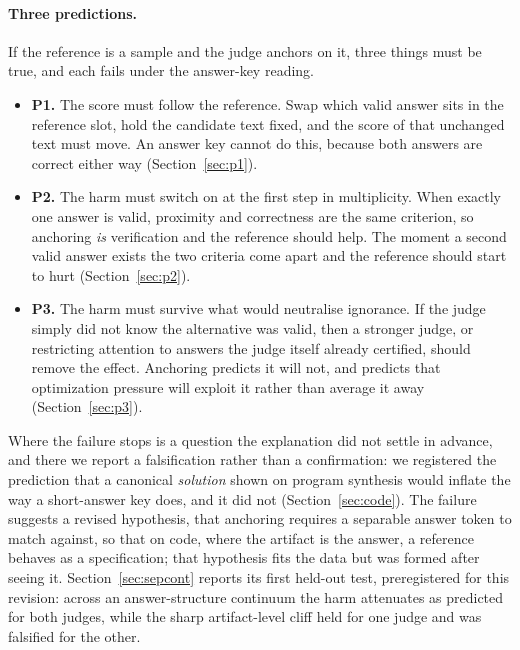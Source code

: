\documentclass[11pt]{article}
\begin{document}
\paragraph{Three predictions.}
If the reference is a sample and the judge anchors on it, three things must be true, and each fails under the answer-key reading.

\begin{itemize}
\item \textbf{P1.} The score must follow the reference. Swap which valid answer sits in the reference slot, hold the candidate text fixed, and the score of that unchanged text must move. An answer key cannot do this, because both answers are correct either way (Section~\ref{sec:p1}).
\item \textbf{P2.} The harm must switch on at the first step in multiplicity. When exactly one answer is valid, proximity and correctness are the same criterion, so anchoring \emph{is} verification and the reference should help. The moment a second valid answer exists the two criteria come apart and the reference should start to hurt (Section~\ref{sec:p2}).
\item \textbf{P3.} The harm must survive what would neutralise ignorance. If the judge simply did not know the alternative was valid, then a stronger judge, or restricting attention to answers the judge itself already certified, should remove the effect. Anchoring predicts it will not, and predicts that optimization pressure will exploit it rather than average it away (Section~\ref{sec:p3}).
\end{itemize}

Where the failure stops is a question the explanation did not settle in advance, and there we report a falsification rather than a confirmation: we registered the prediction that a canonical \emph{solution} shown on program synthesis would inflate the way a short-answer key does, and it did not (Section~\ref{sec:code}).
The failure suggests a revised hypothesis, that anchoring requires a separable answer token to match against, so that on code, where the artifact is the answer, a reference behaves as a specification; that hypothesis fits the data but was formed after seeing it.
Section~\ref{sec:sepcont} reports its first held-out test, preregistered for this revision: across an answer-structure continuum the harm attenuates as predicted for both judges, while the sharp artifact-level cliff held for one judge and was falsified for the other.
\end{document}
